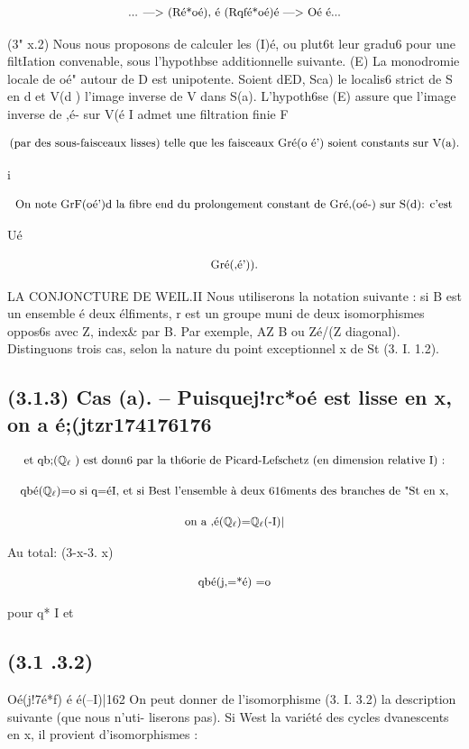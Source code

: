 \documentclass[11pt]{article}
\theoremstyle{remark}
\begin{document}
\[\text{\small ... ---> (Ré*oé), é (Rqfé*oé)é ---> Oé é...}\]

(3" x.2) Nous nous proposons de calculer les (I)é, ou plut6t leur gradu6 pour une filtIation convenable, sous l'hypothbse additionnelle suivante. (E) La monodromie locale de oé" autour de D est unipotente. Soient dED, Sca) le localis6 strict de S en d et V(d ) l'image inverse de V dans S(a). L'hypoth6se (E) assure que l'image inverse de ,é- sur V(é I admet une filtration finie F

\[\text{\small (par des sous-faisceaux lisses) telle que les faisceaux Gré(o é') soient constants sur V(a).}\]

i

\[\text{\small On note GrF(oé')d la fibre end du prolongement constant de Gré,(oé-) sur S(d): c'est}\]

Ué

\[\text{\small Gré(,é')).}\]

LA CONJONCTURE DE WEIL.II Nous utiliserons la notation suivante : si B est un ensemble é deux élfiments, r est un groupe muni de deux isomorphismes oppos6s avec Z, index\& par B. Par exemple, AZ B ou Zé/(Z diagonal). Distinguons trois cas, selon la nature du point exceptionnel x de St (3. I. 1.2).

\subsection*{(3.1.3) Cas (a). -- Puisquej!rc*oé est lisse en x, on a é;(jtzr174176176}

\[\text{\small et qb;(\(\mathbb{Q}_{\ell}\) ) est donn6 par la th6orie de Picard-Lefschetz (en dimension relative I) :}\]

\[\text{\small qbé(\(\mathbb{Q}_{\ell}\))=o si q=éI, et si Best l'ensemble à deux 616ments des branches de "St en x,}\]

\[\text{\small on a ,é(\(\mathbb{Q}_{\ell}\))=\(\mathbb{Q}_{\ell}\)(-I)|}\]

Au total: (3-x-3. x)

\[\text{\small qbé(j,=*é) =o}\]

pour q* I et

\subsection*{(3.1 .3.2)}

Oé(j!7é*f) é é(--I)|162 On peut donner de l'isomorphisme (3. I. 3.2) la description suivante (que nous n'uti- liserons pas). Si West la variété des cycles dvanescents en x, il provient d'isomorphismes :
\end{document}
